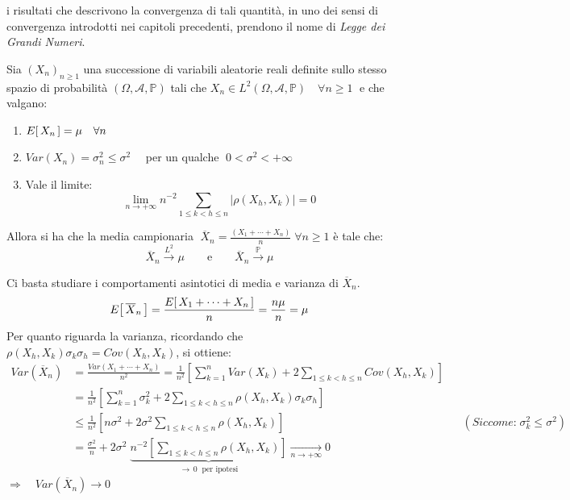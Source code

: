 i risultati che descrivono la convergenza di tali quantità, in uno dei sensi
di convergenza introdotti nei capitoli precedenti, prendono il nome di
\emph{Legge dei Grandi Numeri}.

\begin{teorema}
    Sia $(X_n)_{n\geq 1}$ una successione di variabili aleatorie reali definite sullo stesso spazio di probabilità $(\Omega, \mathcal{A}, \mathbb{P})$ tali che $X_n\in L^2(\Omega, \mathcal{A}, \mathbb{P})\quad \forall n\geq1\;$ e che valgano:
    \begin{enumerate}
        \item $E\!\left[\,X_n\,\right] = \mu \quad \forall n$
        \item $Var(X_n) = \sigma_n^2 \leq \sigma ^2 \quad $ per un qualche $\;0<\sigma^2<+\infty$
        \item Vale il limite:\[\lim_{n\to+\infty} n^{-2} \sum_{1\leq k<h\leq n} \bigl|\rho (X_h, X_k)\bigr| = 0\]
    \end{enumerate}
    Allora si ha che la media campionaria $\;\overline{X}_n = \frac{(X_1+\cdots +X_n)}{n} \;\forall n\geq 1$ è tale che:
    \[\boxed{\overline{X}_n \overset{L^2}{\longrightarrow}\mu\qquad \text{e} \qquad \overline{X}_n \overset{\mathbb{P}}{\longrightarrow}\mu}\]
    \begin{dimostrazione}
        Ci basta studiare i comportamenti asintotici di media e varianza di $\overline{X}_n$.
        \[E\!\left[\,\overline{X}_n\,\right] = \frac{E\!\left[\,X_1 +\cdots +X_n\,\right]}{n} = \frac{n\mu}{n} = \mu\]
        Per quanto riguarda la varianza, ricordando che $\rho (X_h, X_k) \sigma_k\sigma_h = Cov(X_h, X_k)$, si ottiene:
        \begin{align*}
            Var\left(\overline{X}_n\right) & = \frac{Var(X_1+\cdots+X_n)}{n^2} = \frac{1}{n^2}\left[\sum_{k=1}^n Var(X_k) + 2\sum_{1\leq k<h\leq n}Cov(X_h, X_k)\right] \\
            & = \frac{1}{n^2}\left[\sum_{k=1}^n\sigma_k^2 + 2 \sum_{1\leq k<h\leq n} \rho (X_h, X_k) \sigma_k\sigma_h\right] \\ 
            & \leq \frac{1}{n^2} \left[ n \sigma^2 + 2\sigma^2\sum_{1\leq k<h\leq n} \rho (X_h, X_k)\right] && \!\!\!\!\!\!\!\!\!\!\!\!\left(\textit{Siccome:}\;\sigma_k^2\leq \sigma^2\right)\\
            & = \frac{\sigma^2}{n} + 2\sigma^2 \;\underbrace{n^{-2} \left[\sum_{1\leq k<h\leq n} \rho (X_h, X_k)\right]}_{\longrightarrow \,0 \;\text{ per ipotesi}} \underset{n\to+\infty}{\longrightarrow }0
        \end{align*}
        $\Rightarrow \quad Var\left(\overline{X}_n\right) \longrightarrow 0$


\end{dimostrazione}
\end{teorema}
